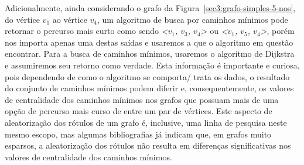 Adicionalmente, ainda considerando o grafo da Figura~\ref{sec3:grafo-simples-5-nos}, do vértice $v_1$ ao vértice $v_4$, um algoritmo de busca por caminhos mínimos pode retornar o percurso mais curto como sendo \emph{<$v_1$, $v_3$, $v_4$>} ou \emph{<$v_1$, $v_5$, $v_4$>}, porém nos importa apenas uma destas saídas e usaremos a que o algoritmo em questão encontrar. Para a busca de caminhos mínimos, usaremos o algoritmo de Dijkstra e assumiremos seu retorno como verdade. Esta informação é importante e curiosa, pois dependendo de como o algoritmo se comporta/ trata os dados, o resultado do conjunto de caminhos mínimos podem diferir e, consequentemente, os valores de centralidade dos caminhos mínimos nos grafos que possuam mais de uma opção de percurso mais curso de entre um par de vértices. Este aspecto de aleatorização dos rótulos de um grafo é, inclusive, uma linha de pesquisa neste mesmo escopo, mas algumas bibliografias já indicam que, em grafos muito esparsos, a aleatorização dos rótulos não resulta em diferenças significativas nos valores de centralidade dos caminhos mínimos.

